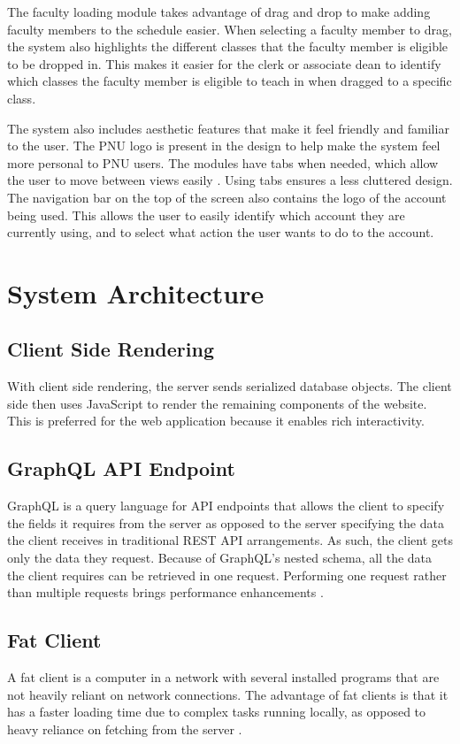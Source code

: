 The faculty loading module takes advantage of drag and drop to make adding faculty members to the schedule easier. When selecting a faculty member to drag, the system also highlights the different classes that the faculty member is eligible to be dropped in. This makes it easier for the clerk or associate dean to identify which classes the faculty member is eligible to teach in when dragged to a specific class.

The system also includes aesthetic features that make it feel friendly and familiar to the user. The PNU logo is present in the design to help make the system feel more personal to PNU users. The modules have tabs when needed, which allow the user to move between views easily \cite{ref:Tabs}. Using tabs ensures a less cluttered design. The navigation bar on the top of the screen also contains the logo of the account being used. This allows the user to easily identify which account they are currently using, and to select what action the user wants to do to the account.

\section{System Architecture}

\subsection{Client Side Rendering}
With client side rendering, the server sends serialized database objects. The client side then uses JavaScript to render the remaining components of the website. This is preferred for the web application because it enables rich interactivity. \cite{ref:ClientSide}

\subsection{GraphQL API Endpoint}
GraphQL is a query language for API endpoints that allows the client to specify the fields it requires from the server as opposed to the server specifying the data the client receives in traditional REST API arrangements. As such, the client gets only the data they request. Because of GraphQL's nested schema, all the data the client requires can be retrieved in one request. Performing one request rather than multiple requests brings performance enhancements \cite{ref:GraphQL}.

\subsection{Fat Client}
A fat client is a computer in a network with several installed programs that are not heavily reliant on network connections. The advantage of fat clients is that it has a faster loading time due to complex tasks running locally, as opposed to heavy reliance on fetching from the server \cite{ref:FatClient}.

